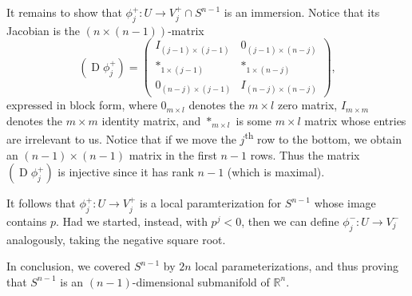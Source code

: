 \documentclass[notoc,notitlepage]{tufte-book}
\DeclareMathOperator{\D}{D}
\begin{document}
\begin{eg}
  It remains to show that $\phi_j^+ : U \to V_j^+ \cap S^{n - 1}$ is an
  immersion. Notice that its Jacobian is the $(n \times (n - 1))$-matrix
  \begin{equation*}
    (\D \phi_j^+) = \begin{pmatrix}
      I_{(j - 1) \times (j - 1)} & 0_{(j - 1) \times (n - j)} \\
      *_{1 \times (j - 1)}       & *_{1 \times (n - j)} \\
      0_{(n - j) \times (j - 1)} & I_{(n - j) \times (n - j)}
    \end{pmatrix},
  \end{equation*}
  expressed in block form, where $0_{m \times l}$ denotes the $m \times l$ zero
  matrix, $I_{m \times m}$ denotes the $m \times m$ identity matrix, and $*_{m
  \times l}$ is some $m \times l$ matrix whose entries are irrelevant to us.
  Notice that if we move the $j$\textsuperscript{th} row to the bottom, we
  obtain an $(n - 1) \times (n - 1)$ matrix in the first $n - 1$ rows. Thus the
  matrix $(\D \phi_j^+)$ is injective since it has rank $n - 1$ (which is
  maximal).

  It follows that $\phi_j^+ : U \to V_j^+$ is a local paramterization for $S^{n
  - 1}$ whose image contains $p$. Had we started, instead, with $p^j < 0$, then
  we can define $\phi_j^- : U \to V_j^-$ analogously, taking the negative square
  root.

  In conclusion, we covered $S^{n - 1}$ by $2n$ local parameterizations, and thus
  proving that $S^{n - 1}$ is an $( n - 1 )$-dimensional submanifold of
  $\mathbb{R}^n$.
\end{eg}
\end{document}
